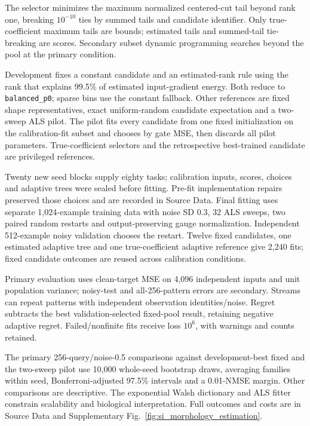 The selector minimizes the maximum normalized centered-cut tail beyond rank one, breaking $10^{-10}$ ties by summed tails and candidate identifier. Only true-coefficient maximum tails are bounds; estimated tails and summed-tail tie-breaking are scores. Secondary subset dynamic programming searches beyond the pool at the primary condition.

Development fixes a constant candidate and an estimated-rank rule using the rank that explains 99.5\% of estimated input-gradient energy. Both reduce to \texttt{balanced\_p0}; sparse bins use the constant fallback. Other references are fixed shape representatives, exact uniform-random candidate expectation and a two-sweep ALS pilot. The pilot fits every candidate from one fixed initialization on the calibration-fit subset and chooses by gate MSE, then discards all pilot parameters. True-coefficient selectors and the retrospective best-trained candidate are privileged references.

Twenty new seed blocks supply eighty tasks; calibration inputs, scores, choices and adaptive trees were sealed before fitting. Pre-fit implementation repairs preserved those choices and are recorded in Source Data. Final fitting uses separate 1,024-example training data with noise SD 0.3, 32 ALS sweeps, two paired random restarts and output-preserving gauge normalization. Independent 512-example noisy validation chooses the restart. Twelve fixed candidates, one estimated adaptive tree and one true-coefficient adaptive reference give 2,240 fits; fixed candidate outcomes are reused across calibration conditions.

Primary evaluation uses clean-target MSE on 4,096 independent inputs and unit population variance; noisy-test and all-256-pattern errors are secondary. Streams can repeat patterns with independent observation identities/noise. Regret subtracts the best validation-selected fixed-pool result, retaining negative adaptive regret. Failed/nonfinite fits receive loss $10^6$, with warnings and counts retained.

The primary 256-query/noise-0.5 comparisons against development-best fixed and the two-sweep pilot use 10,000 whole-seed bootstrap draws, averaging families within seed, Bonferroni-adjusted 97.5\% intervals and a 0.01-NMSE margin. Other comparisons are descriptive. The exponential Walsh dictionary and ALS fitter constrain scalability and biological interpretation. Full outcomes and costs are in Source Data and Supplementary Fig.~\ref{fig:si_morphology_estimation}.

